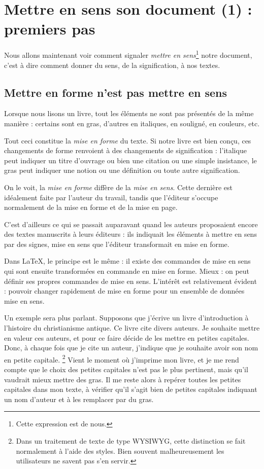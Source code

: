 \chapter{Mettre en sens son document (1) : premiers pas}

\begin{prealable}
	Nous allons maintenant voir comment signaler \emph{mettre en sens}\footnote{Cette expression est de nous.} notre document, c'est à dire comment donner du sens, de la signification, à nos textes.
\end{prealable}

\section{Mettre en forme n'est pas mettre en sens}\label{sensforme}

Lorsque nous lisons un livre, tout les éléments ne sont pas présentés de la même manière : certains sont en gras, d'autres en italiques, en souligné, en couleurs, etc. 

Tout ceci constitue la \emph{mise en forme} du texte. Si notre livre est bien conçu, ces changements de forme renvoient à des changements de signification : l'italique peut indiquer un titre d'ouvrage ou bien une citation ou une simple insistance, le gras peut indiquer une notion ou une définition ou toute autre signification.

On le voit, la \emph{mise en forme} diffère de la \emph{mise en sens}. Cette dernière est idéalement faite par l'auteur du travail, tandis que l'éditeur s'occupe normalement de la mise en forme et de la mise en page.

C'est d'ailleurs ce qui se passait auparavant quand les auteurs proposaient encore des textes manuscrits à leurs éditeurs : ils indiquait les éléments à mettre en sens par des signes, mise en sens que l'éditeur transformait en mise en forme.

Dans \LaTeX, le principe est le même : il existe des commandes de mise en sens qui sont ensuite transformées en commande en mise en forme. Mieux : on peut définir ses propres commandes de mise en sens. L'intérêt est relativement évident : pouvoir changer rapidement de mise en forme pour un ensemble de données mise en sens.

Un exemple sera plus parlant. Supposons que j'écrive un livre d'introduction à l'histoire du christianisme antique. Ce livre cite divers auteurs. Je souhaite mettre en valeur ces auteurs, et pour ce faire décide de les mettre en petites capitales.
Donc, à chaque fois que je cite un auteur, j'indique que je souhaite avoir son nom en petite capitale.
\footnote{Dans un traitement de texte de type WYSIWYG, cette distinction se fait normalement à l'aide des styles. Bien souvent malheureusement les utilisateurs ne savent pas s'en servir.}
Vient le moment où j'imprime mon livre, et je me rend compte que le choix des petites capitales n'est pas le plus pertinent, mais qu'il vaudrait mieux mettre des gras. Il me reste alors à repérer toutes les petites capitales dans mon texte, à vérifier qu'il s'agit bien de petites capitales indiquant un nom d'auteur et à les remplacer par du gras.

